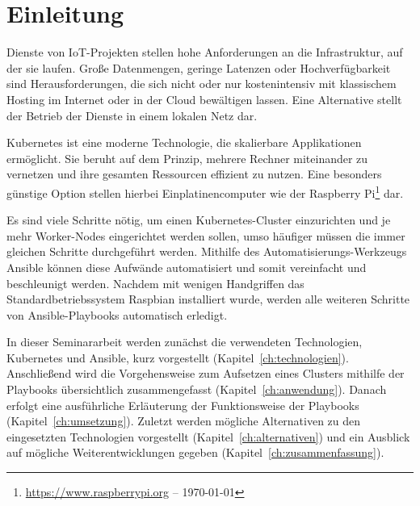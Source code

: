 \chapter{Einleitung}\label{ch:einleitung}

Dienste von IoT-Projekten stellen hohe Anforderungen an die Infrastruktur, auf der sie laufen.
Große Datenmengen, geringe Latenzen oder Hochverfügbarkeit sind Herausforderungen, die sich nicht oder nur kostenintensiv mit klassischem Hosting im Internet oder in der Cloud bewältigen lassen.
Eine Alternative stellt der Betrieb der Dienste in einem lokalen Netz dar.

Kubernetes ist eine moderne Technologie, die skalierbare Applikationen ermöglicht.
Sie beruht auf dem Prinzip, mehrere Rechner miteinander zu vernetzen und ihre gesamten Ressourcen effizient zu nutzen.
Eine besonders günstige Option stellen hierbei Einplatinencomputer wie der Raspberry Pi\footnote{\url{https://www.raspberrypi.org} -- \today} dar.

Es sind viele Schritte nötig, um einen Kubernetes-Cluster einzurichten und je mehr Worker-Nodes eingerichtet werden sollen, umso häufiger müssen die immer gleichen Schritte durchgeführt werden.
Mithilfe des Automatisierungs-Werkzeugs Ansible können diese Aufwände automatisiert und somit vereinfacht und beschleunigt werden.
Nachdem mit wenigen Handgriffen das Standardbetriebssystem Raspbian installiert wurde, werden alle weiteren Schritte von Ansible-Playbooks automatisch erledigt.

In dieser Seminararbeit werden zunächst die verwendeten Technologien, Kubernetes und Ansible, kurz vorgestellt (Kapitel~\ref{ch:technologien}).
Anschließend wird die Vorgehensweise zum Aufsetzen eines Clusters mithilfe der Playbooks übersichtlich zusammengefasst (Kapitel~\ref{ch:anwendung}).
Danach erfolgt eine ausführliche Erläuterung der Funktionsweise der Playbooks (Kapitel~\ref{ch:umsetzung}).
Zuletzt werden mögliche Alternativen zu den eingesetzten Technologien vorgestellt (Kapitel~\ref{ch:alternativen}) und ein Ausblick auf mögliche Weiterentwicklungen gegeben (Kapitel~\ref{ch:zusammenfassung}).